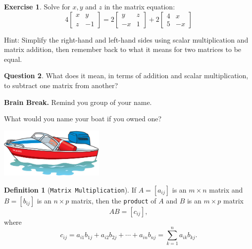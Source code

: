 \documentclass[handout]{beamer}
\newcommand{\fn}{\insertframenumber}
\theoremstyle{definition}
\newtheorem{exercise}{Exercise}
\newtheorem{question}[exercise]{Question}
\newtheorem*{defn}{Definition}
\renewcommand{\emph}[1]{{\color{blue}\texttt{#1}}}
\begin{document}
\begin{frame}{\fn}
	\begin{exercise}
		Solve for $x,y$ and $z$ in the matrix equation:	
		\[
			4\begin{bmatrix}
			x&y\\z&-1
			\end{bmatrix}
			=
			2\begin{bmatrix}
			y&z\\-x&1
			\end{bmatrix}
			+
			2\begin{bmatrix}
			4&x\\5&-x
			\end{bmatrix}
		\]
		
		Hint: Simplify the right-hand and left-hand sides using scalar multiplication and matrix addition, then remember back to what it means for two matrices to be equal.
	\end{exercise}
	\pause
	\begin{question}
		What does it mean, in terms of addition and scalar multiplication, to subtract one matrix from another?
	\end{question}
\end{frame}

\begin{frame}{\fn}
	\begin{block}{\textbf{Brain Break.}}
		Remind you group of your name.
		
		What would you name your boat if you owned one?
		
		\begin{center}
			\includegraphics[width=2in]{../images/boat}
		\end{center}
	\end{block}
\end{frame}
\begin{frame}{\fn}
	\begin{defn}[\emph{Matrix Multiplication}]
		If $A=[a_{ij}]$ is an $m\times n$ matrix and $B=[b_{ij}]$ is an $n\times p$ matrix, then the \emph{product} of $A$ and $B$ is an $m\times p$ matrix 
		\[AB=[c_{ij}],\]
		where
		\[c_{ij}=a_{i1}b_{1j}+a_{i2}b_{2j}+\cdots+a_{in}b_{nj}=\sum_{k=1}^n a_{ik}b_{kj}.\]
	\end{defn}
\end{frame}
\end{document}
